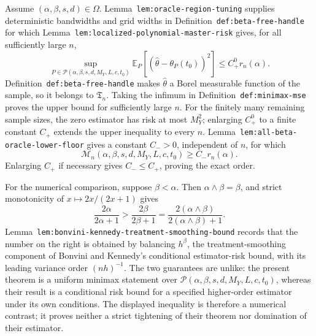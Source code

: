 Assume \((\alpha,\beta,s,d)\in\Omega\). Lemma~\texttt{lem:oracle-region-tuning} supplies deterministic bandwidths and grid widths in Definition~\texttt{def:beta-free-handle} for which Lemma~\texttt{lem:localized-polynomial-master-risk} gives, for all sufficiently large \(n\),
\[
\sup_{P\in\mathcal P(\alpha,\beta,s,d,M_Y,L,c,t_0)}
\mathbb E_P[(\widehat\theta-\theta_P(t_0))^2]
\le C_+^0r_n(\alpha).
\]
Definition~\texttt{def:beta-free-handle} makes \(\widehat\theta\) a Borel measurable function of the sample, so it belongs to \(\mathfrak T_n\). Taking the infimum in Definition~\texttt{def:minimax-mse} proves the upper bound for sufficiently large \(n\). For the finitely many remaining sample sizes, the zero estimator has risk at most \(M_Y^2\); enlarging \(C_+^0\) to a finite constant \(C_+\) extends the upper inequality to every \(n\). Lemma~\texttt{lem:all-beta-oracle-lower-floor} gives a constant \(C_->0\), independent of \(n\), for which
\[
\mathcal M_n(\alpha,\beta,s,d,M_Y,L,c,t_0)\ge C_-r_n(\alpha).
\]
Enlarging \(C_+\) if necessary gives \(C_-\le C_+\), proving the exact order.

For the numerical comparison, suppose \(\beta<\alpha\). Then \(\alpha\wedge\beta=\beta\), and strict monotonicity of \(x\mapsto2x/(2x+1)\) gives
\[
\frac{2\alpha}{2\alpha+1}>
\frac{2\beta}{2\beta+1}
=\frac{2(\alpha\wedge\beta)}{2(\alpha\wedge\beta)+1}.
\]
Lemma~\texttt{lem:bonvini-kennedy-treatment-smoothing-bound} records that the number on the right is obtained by balancing \(h^\beta\), the treatment-smoothing component of Bonvini and Kennedy's conditional estimator-risk bound, with its leading variance order \((nh)^{-1}\). The two guarantees are unlike: the present theorem is a uniform minimax statement over \(\mathcal P(\alpha,\beta,s,d,M_Y,L,c,t_0)\), whereas their result is a conditional risk bound for a specified higher-order estimator under its own conditions. The displayed inequality is therefore a numerical contrast; it proves neither a strict tightening of their theorem nor domination of their estimator.